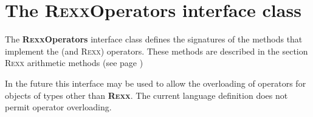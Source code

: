\section{The R\textsc{exx}Operators interface class}\label{refnlrops}
 
The \textbf{R\textsc{exx}Operators} interface class defines the signatures of
the methods that implement the \nr{} (and R\textsc{exx}) operators.  These
methods are described in the section  R\textsc{exx} arithmetic methods (see page \pageref{refrexxops}) 

In the future this interface may be used to allow the overloading of
operators for objects of types other than \textbf{R\textsc{exx}}.  The current
\nr{} language definition does not permit operator overloading.
